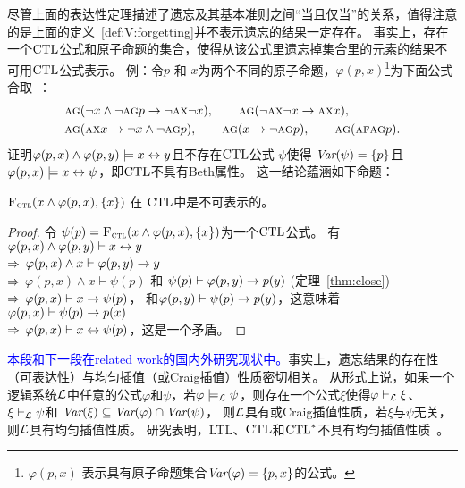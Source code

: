 尽管上面的表达性定理描述了遗忘及其基本准则之间“当且仅当”的关系，值得注意的是上面的定义~\ref{def:V:forgetting}并不表示遗忘的结果一定存在。
事实上，存在一个$\textrm{CTL}$公式和原子命题的集合，使得从该公式里遗忘掉集合里的元素的结果不可用$\textrm{CTL}$公式表示。
例：令$p$ 和 $x$为两个不同的原子命题，$\varphi(p,x)$\footnote{$\varphi(p,x)$ 表示具有原子命题集合$\textit{Var}(\varphi)=\{p,x\}$的公式。}为下面公式合取~\cite{Maksimova:JANCL:1991}：
\begin{align*}
	&\textsc{a}\textsc{g}(\neg x \wedge \neg \textsc{a} \textsc{g} p \rightarrow \neg \textsc{a} \textsc{x} \neg x),
	\qquad \textsc{a}\textsc{g}(\neg \textsc{a}\textsc{x} \neg x \rightarrow \textsc{a} \textsc{x} x),\\
	& \textsc{a}\textsc{g}(\textsc{a}\textsc{x} x \rightarrow \neg x \wedge \neg \textsc{a} \textsc{g} p),
	\qquad \textsc{a}\textsc{g}(x \rightarrow \neg \textsc{a}\textsc{g} p),
	\qquad \textsc{a}\textsc{g}(\textsc{a} \textsc{f} \textsc{a} \textsc{g} p).
\end{align*}
\citeauthor{Maksimova:JANCL:1991}证明$\varphi(p,x)\land \varphi(p,y)\models x\leftrightarrow y$且不存在$\textrm{CTL}$公式 $\psi$使得 $\textit{Var}(\psi)=\{p\}$且$\varphi(p,x)\models x\leftrightarrow \psi$，即$\textrm{CTL}$不具有Beth属性。
这一结论蕴涵如下命题：
\begin{proposition}\label{pro:uniforget}
	${\textsc{F}_{\textsc{ctl}}}(x\land \varphi(p,x), \{x\})$ 在 $\textrm{CTL}$中是不可表示的。
\end{proposition}
\begin{proof}
	令 $\psi(p)={\textsc{F}_{\textsc{ctl}}}(x\land \varphi(p,x), \{x\})$为一个$\textrm{CTL}$公式。
	有 \\
	$\varphi(p,x)\land \varphi(p,y)\vdash x\leftrightarrow y$\\
	$\Rightarrow$ $\varphi(p,x)\land x \vdash \varphi(p,y)\rightarrow y$\\
	$\Rightarrow$ $\varphi(p,x)\land x\vdash \psi(p)$ 和 $\psi(p)\vdash \varphi(p,y)\rightarrow p(y)$ (定理~\ref{thm:close})\\
	$\Rightarrow$ $\varphi(p,x)\vdash x\rightarrow\psi(p)$， 和$\varphi(p,y)\vdash \psi(p)\rightarrow p(y)$，这意味着 $\varphi(p,x)\vdash \psi(p)\rightarrow p(x)$\\
	$\Rightarrow$ $\varphi(p,x)\vdash x\leftrightarrow \psi(p)$，这是一个矛盾。
\end{proof}

\textcolor{blue}{本段和下一段在related work的国内外研究现状中。}事实上，遗忘结果的存在性（可表达性）与均匀插值（或Craig插值）性质密切相关。
从形式上说，如果一个逻辑系统${\cal L}$中任意的公式$\varphi$和$\psi$，若$\varphi\models_{\cal L} \psi$，则存在一个公式$\xi$使得$\varphi\vdash_{\cal L}\xi$、$\xi\vdash_{\cal L}\psi$和 $\textit{Var}(\xi)\subseteq \textit{Var}(\varphi)\cap \textit{Var}(\psi)$，
则${\cal L}$具有或Craig插值性质，若$\xi$与$\psi$无关，则${\cal L}$具有均匀插值性质。
研究表明，LTL、$\textrm{CTL}$和$\textrm{CTL}^*$不具有均匀插值性质~\cite{Maksimova:JANCL:1991,DAgostino:synthese:2008}。



